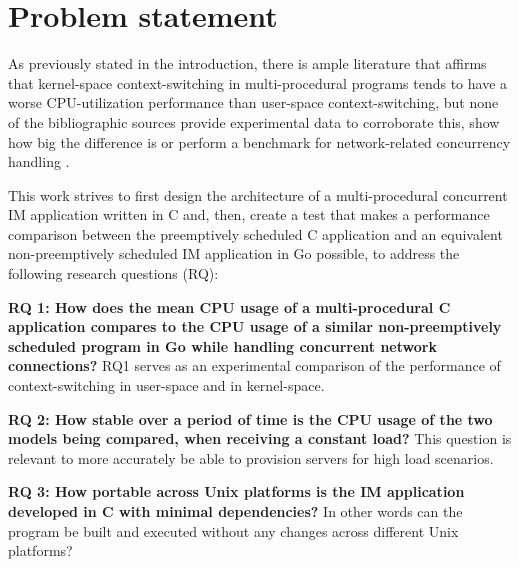 \section{Problem statement}
As previously stated in the introduction, there is ample literature that affirms that kernel-space context-switching in multi-procedural programs tends to have a worse CPU-utilization performance than user-space context-switching, but none of the bibliographic sources provide experimental data to corroborate this, show how big the difference is or perform a benchmark for network-related concurrency handling \cite{2003Events}\cite{2005Threads}\cite{2013ContextSwitching}\cite{Cox-Buday2017}\cite{Kerrisk2010}.

This work strives to first design the architecture of a multi-procedural concurrent IM application written in C and, then, create a test that makes a performance comparison between the preemptively scheduled C application and an equivalent non-preemptively scheduled IM application in Go possible, to address the following research questions (RQ):

\textbf{RQ 1: How does the mean CPU usage of a multi-procedural C application compares to the CPU usage of a similar non-preemptively scheduled program in Go while handling concurrent network connections?} RQ1 serves as an experimental comparison of the performance of context-switching in user-space and in kernel-space. 

\textbf{RQ 2: How stable over a period of time is the CPU usage of the two models being compared, when receiving a constant load?} This question is relevant to more accurately be able to provision servers for high load scenarios.

\textbf{RQ 3: How portable across Unix platforms is the IM application developed in C with minimal dependencies?} In other words can the program be built and executed without any changes across different Unix platforms?




